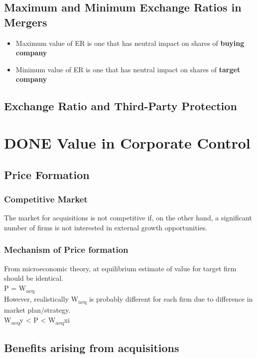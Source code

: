 \documentclass[11pt]{article}
\begin{document}
\subsection*{Maximum and Minimum Exchange Ratios in Mergers}
\label{sec:org4d20bcf}
\begin{itemize}
\item Maximum value of ER is one that has neutral impact on shares of \textbf{buying company}\\
\item Minimum value of ER is one that has neutral impact on shares of \textbf{target company}\\
\end{itemize}
\subsection*{Exchange Ratio and Third-Party Protection}
\label{sec:org6d28412}
\section*{{\bfseries\sffamily DONE} Value in Corporate Control}
\label{sec:org7d62a1b}
\subsection*{Price Formation}
\label{sec:orge5129be}
\subsubsection*{Competitive Market}
\label{sec:org9981b90}
The market for acquisitions is not competitive if, on the other hand, a significant number of firms is not interested in external growth opportunities.\\
\subsubsection*{Mechanism of Price formation}
\label{sec:org0a3fb59}
From microeconomic theory, at equilibrium estimate of value for target firm should be identical.\\
P = W\textsubscript{acq}\\
However, realistically W\textsubscript{acq} is probably different for each firm due to difference in market plan/strategy.\\
W\textsubscript{acq}y < P < W\textsubscript{acq}xi\\
\subsection*{Benefits arising from acquisitions}
\label{sec:orgde582bc}
\end{document}
